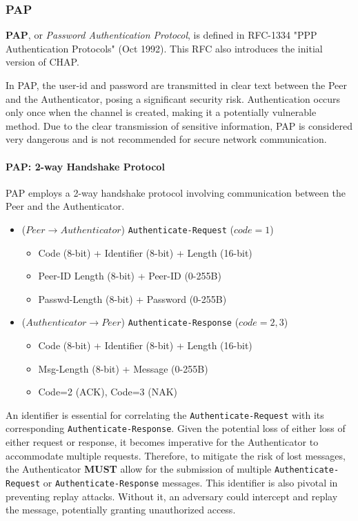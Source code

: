 \subsubsection{PAP}
\textbf{PAP}, or \textit{Password Authentication Protocol}, is defined in RFC-1334 "PPP Authentication Protocols" (Oct 1992). This RFC also introduces the initial version of CHAP.

In PAP, the user-id and password are transmitted in clear text between the Peer and the Authenticator, posing a significant security risk. Authentication occurs only once when the channel is created, making it a potentially vulnerable method. Due to the clear transmission of sensitive information, PAP is considered very dangerous and is not recommended for secure network communication.

\paragraph{PAP: 2-way Handshake Protocol}
PAP employs a 2-way handshake protocol involving communication between the Peer and the Authenticator.

\begin{itemize}
	\item ($Peer \rightarrow Authenticator$) \texttt{Authenticate-Request} ($code=1$)
	      \begin{itemize}
		      \item Code (8-bit) + Identifier (8-bit) + Length (16-bit)
		      \item Peer-ID Length (8-bit) + Peer-ID (0-255B)
		      \item Passwd-Length (8-bit) + Password (0-255B)
	      \end{itemize}
	\item ($Authenticator \rightarrow Peer$) \texttt{Authenticate-Response} ($code= 2, 3$)
	      \begin{itemize}
		      \item Code (8-bit) + Identifier (8-bit) + Length (16-bit)
		      \item Msg-Length (8-bit) + Message (0-255B)
		      \item Code=2 (ACK), Code=3 (NAK)
	      \end{itemize}
\end{itemize}

An identifier is essential for correlating the \texttt{Authenticate-Request} with its corresponding \texttt{Authenticate-Response}. Given the potential loss of either loss of either request or response, it becomes imperative for the Authenticator to accommodate multiple requests. Therefore, to mitigate the risk of lost messages, the Authenticator \textbf{MUST} allow for the submission of multiple \texttt{Authenticate-Request} or \texttt{Authenticate-Response} messages.
This identifier is also pivotal in preventing replay attacks. Without it, an adversary could intercept and replay the message, potentially granting unauthorized access.



